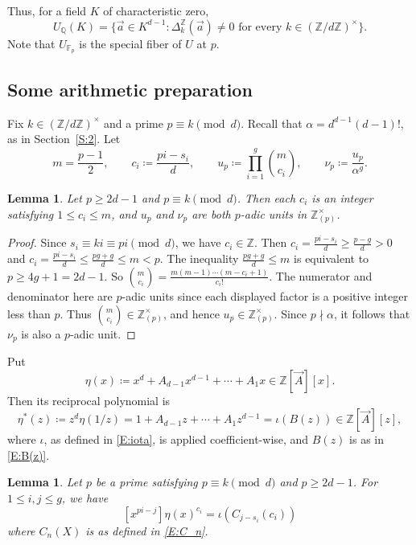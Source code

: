 \documentclass{amsart}
\theoremstyle{plain}
\newtheorem{lemma}[theorem]{Lemma}
\theoremstyle{remark}
\newcommand{\1}{\mathbf{1}}
\newcommand{\F}{\mathbb{F}}
\newcommand{\Q}{\mathbb{Q}}
\newcommand{\Z}{\mathbb{Z}}
\newcommand{\va}{{\vec{a}}}
\newcommand{\vA}{{\vec{A}}}
\begin{document}
Thus,
for a field $K$ of characteristic zero,
\[
U_\Q(K)=\{\va\in K^{d-1} :
\Delta_k^\Z(\va)\ne 0 \text{ for every }k\in(\Z/d\Z)^\times
\}.
\]
Note that $U_{\F_p}$ is the special fiber of $U$ at $p$.

\subsection{Some arithmetic preparation}
\label{S:3.2}

Fix $k\in(\Z/d\Z)^\times$ and a prime $p\equiv k\pmod d$.
Recall that $\alpha=d^{d-1}(d-1)!$, as in Section~\ref{S:2}.
Let
\begin{equation*}
m=\frac{p-1}{2},\qquad c_i\coloneqq \frac{pi-s_i}{d}, \qquad
u_p\coloneqq \prod_{i=1}^g\binom{m}{c_i},\qquad \nu_p\coloneqq
\frac{u_p}{\alpha^g}.
\end{equation*}


\begin{lemma}\label{L:u_p}
Let $p\ge 2d-1$ and $p\equiv k\pmod d$.
Then each $c_i$ is an integer satisfying
$1\le c_i\le m$, and
$u_p$ and $\nu_p$ are both $p$-adic units in $\Z_{(p)}^\times$.
\end{lemma}
\begin{proof}
Since $s_i\equiv ki \equiv pi\pmod d$, we have $c_i\in\Z$.
Then $c_i=\frac{pi-s_i}{d}\ge\frac{p-g}{d}>0$ and
$c_i=\frac{pi-s_i}{d}\le \frac{pg+g}{d}\le m<p$. The inequality
$\frac{pg+g}{d}\le m$ is equivalent to $p\ge 4g+1=2d-1$.
So $\binom{m}{c_i}=\frac{m(m-1)\cdots (m-c_i+1)}{c_i!}$.
The numerator and denominator here are $p$-adic units since
each displayed factor is a positive integer less than $p$.
Thus $\binom{m}{c_i}\in\Z_{(p)}^\times$, and hence
$u_p\in\Z_{(p)}^\times$. Since $p\nmid \alpha$,
it follows that $\nu_p$ is also a $p$-adic unit.
\end{proof}

Put
\begin{equation}\label{E:eta}
\eta(x)\coloneqq x^d+A_{d-1}x^{d-1}+\cdots+A_1x\in\Z[\vA][x].
\end{equation}
Then its reciprocal polynomial is
\[
\eta^*(z)\coloneqq z^d \eta(1/z) = 1+A_{d-1}z+\cdots+A_1z^{d-1}=\iota(B(z))\in\Z[\vA][z],
\]
where $\iota$, as defined in \eqref{E:iota}, is applied coefficient-wise,
and $B(z)$ is as in \eqref{E:B(z)}.

\begin{lemma}\label{L:reverse}
Let $p$ be a prime satisfying $p\equiv k\pmod d$
and $p\ge 2d-1$. For $1\le i,j\le g$,
we have
\[
[x^{pi-j}]\eta(x)^{c_i}
=\iota\left(C_{j-s_i}(c_i) \right)
\]
where $C_n(X)$ is as defined in \eqref{E:C_n}.
\end{lemma}
\end{document}
